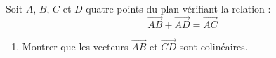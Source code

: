 \begin{exo}{}
	Soit $A$, $B$, $C$ et $D$ quatre points du plan vérifiant la relation : $$\vec{AB} + \vec{AD} = \vec{AC}$$
	\begin{enumerate}
		\item Montrer que les vecteurs $\vec{AB}$ et $\vec{CD}$ sont colinéaires.
	\end{enumerate}
\end{exo}
